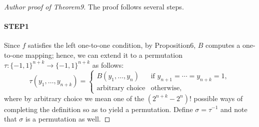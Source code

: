 \begin{proof}[Author proof of Theorem9]
The proof follows several steps.
\paragraph{STEP1}
Since $f$ satisfies the left one-to-one condition, by Proposition6, $B$ computes a one-to-one mapping; hence, we can extend it to a permutation $\tau:\{-1,1\}^{n+k}\to\{-1,1\}^{n+k}$ as follows:
\[\tau(y_1,\ldots,y_{n+k})=\begin{cases}B(y_1,\ldots,y_n)&\text{if }y_{n+1}=\cdots=y_{n+k}=1,\\\text{arbitrary choice}&\text{otherwise},\end{cases}\]
where by arbitrary choice we mean one of the $(2^{n+k}-2^n)!$ possible ways of completing the definition so as to yield a permutation. Define $\sigma=\tau^{-1}$ and note that $\sigma$ is a permutation as well.

\end{proof}
